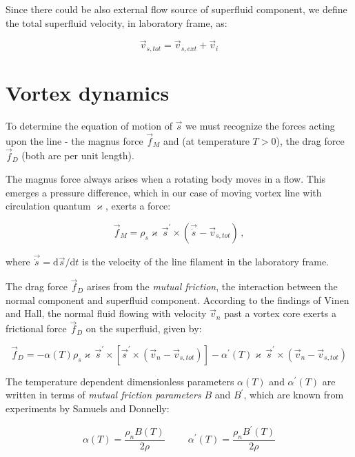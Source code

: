 Since there could be also external flow source of superfluid component, we define the total superfluid velocity, in laboratory frame, as:

\begin{equation}
\vec{v}_{s,tot} = \vec{v}_{s,ext} + \vec{v}_i
\end{equation}

\section{Vortex dynamics}

To determine the equation of motion of $\vec{s}$ we must recognize the forces acting upon the line - the magnus force $\vec{f}_M$ and (at temperature $T>0$), the drag force $\vec{f}_D$ (both are per unit length).

The magnus force always arises when a rotating body moves in a flow. This emerges a pressure difference, which in our case of moving vortex line with circulation quantum $\varkappa$, exerts a force:

\begin{equation}
\vec{f}_M = \rho_s \varkappa \,\vec{s}^{\prime} \times (\vec{\dot{s}} - \vec{v}_{s,tot})\,,
\end{equation}

where $\vec{\dot{s}} = \text{d}\vec{s} / \text{d} t$ is the velocity of the line filament in the laboratory frame.

The drag force $\vec{f}_D$ arises from the \textit{mutual friction}, the interaction between the normal component and superfluid component. According to the findings of Vinen and Hall, the normal fluid flowing with velocity $\vec{v}_n$ past a vortex core exerts a frictional force $\vec{f}_D$ on the superfluid, given by:

\begin{equation}
\vec{f}_D = - \alpha(T)\rho_s\varkappa\,\vec{s}^{\prime} \times [\vec{s}^{\prime} \times (\vec{v}_n - \vec{v}_{s,tot})] - \alpha^{\prime}(T)\varkappa\,\vec{s}^{\prime} \times (\vec{v}_n - \vec{v}_{s,tot})
\end{equation}

The temperature dependent dimensionless parameters $\alpha(T)$ and $\alpha^{\prime}(T)$ are written in terms of \textit{mutual friction parameters} $B$ and $B^{\prime}$, which are known from experiments by Samuels and Donnelly:

\begin{equation}
\alpha(T) = \frac{\rho_n B(T)}{2\rho}
\hspace{1cm}
\alpha^{\prime}(T) = \frac{\rho_n B^{\prime}(T)}{2\rho}
\end{equation}

